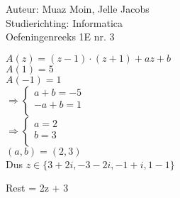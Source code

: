 \documentclass[a4paper]{article}
\begin{document}
  
\noindent \large Auteur: Muaz Moin, Jelle Jacobs\\
\noindent \large Studierichting: Informatica\\
\noindent \large Oefeningenreeks 1E nr. 3\\

\medskip

\normalsize


$A\left(z\right) = \left(z-1\right) \cdot \left(z + 1\right) + az + b$\\

$A\left(1\right) = 5$\\

$A\left(-1\right) = 1$\\

 $\Rightarrow\left\{
	\begin{array}{l}
		a + b  = -5\\
		-a + b = 1\\
	\end{array}
    \right .$\\

 $\Rightarrow\left\{
	\begin{array}{l}
		a = 2\\
		b = 3\\
	\end{array}
    \right .$\\

$\left(a,b\right) = \left(2,3\right)$\\

Dus $z \in \{ 3+2i, -3-2i, -1+i, 1-1\}$

Rest = 2z + 3
\begin{thebibliography}{999}
\end{thebibliography}
\end{document}
